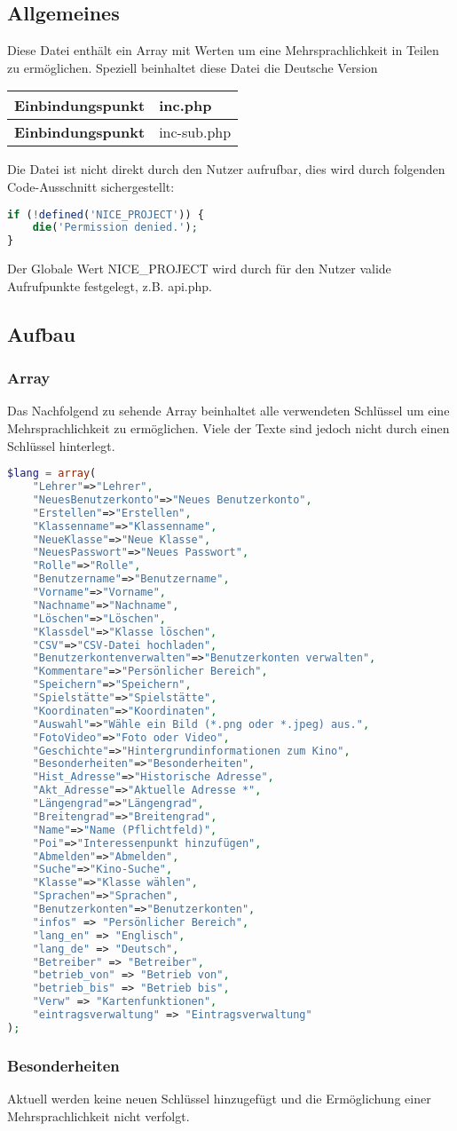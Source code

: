 \label{lang:de}
\subsection{Allgemeines} Diese Datei enthält ein Array mit Werten um eine Mehrsprachlichkeit in Teilen zu ermöglichen. Speziell beinhaltet diese Datei die Deutsche Version
\begin{table}[H]
	\begin{tabular}{|c|p{11cm}|}
		\hline
		\textbf{Einbindungspunkt} & inc.php \\ \hline
		\textbf{Einbindungspunkt} & inc-sub.php \\ \hline
	\end{tabular}
\end{table}
Die Datei ist nicht direkt durch den Nutzer aufrufbar, dies wird durch folgenden Code-Ausschnitt sichergestellt:
\begin{lstlisting}[language=php]
if (!defined('NICE_PROJECT')) {
	die('Permission denied.');
}
\end{lstlisting}
Der Globale Wert {\glqq NICE\_PROJECT\grqq} wird durch für den Nutzer valide Aufrufpunkte festgelegt, z.B. {\glqq api.php\grqq}.
\newpage
\subsection{Aufbau}
\subsubsection{Array}
Das Nachfolgend zu sehende Array beinhaltet alle verwendeten Schlüssel um eine Mehrsprachlichkeit zu ermöglichen. Viele der Texte sind jedoch nicht durch einen Schlüssel hinterlegt.
\begin{lstlisting}[language=php]
$lang = array(
	"Lehrer"=>"Lehrer",
	"NeuesBenutzerkonto"=>"Neues Benutzerkonto",
	"Erstellen"=>"Erstellen",
	"Klassenname"=>"Klassenname",
	"NeueKlasse"=>"Neue Klasse",
	"NeuesPasswort"=>"Neues Passwort",
	"Rolle"=>"Rolle",
	"Benutzername"=>"Benutzername",
	"Vorname"=>"Vorname",
	"Nachname"=>"Nachname",
	"Löschen"=>"Löschen",
	"Klassdel"=>"Klasse löschen",
	"CSV"=>"CSV-Datei hochladen",
	"Benutzerkontenverwalten"=>"Benutzerkonten verwalten",
	"Kommentare"=>"Persönlicher Bereich",
	"Speichern"=>"Speichern",
	"Spielstätte"=>"Spielstätte",
	"Koordinaten"=>"Koordinaten",
	"Auswahl"=>"Wähle ein Bild (*.png oder *.jpeg) aus.",
	"FotoVideo"=>"Foto oder Video",
	"Geschichte"=>"Hintergrundinformationen zum Kino",
	"Besonderheiten"=>"Besonderheiten",
	"Hist_Adresse"=>"Historische Adresse",
	"Akt_Adresse"=>"Aktuelle Adresse *",
	"Längengrad"=>"Längengrad",
	"Breitengrad"=>"Breitengrad",
	"Name"=>"Name (Pflichtfeld)",
	"Poi"=>"Interessenpunkt hinzufügen",
	"Abmelden"=>"Abmelden",
	"Suche"=>"Kino-Suche",
	"Klasse"=>"Klasse wählen",
	"Sprachen"=>"Sprachen",
	"Benutzerkonten"=>"Benutzerkonten",
	"infos" => "Persönlicher Bereich",
	"lang_en" => "Englisch",
	"lang_de" => "Deutsch",
	"Betreiber" => "Betreiber",
	"betrieb_von" => "Betrieb von",
	"betrieb_bis" => "Betrieb bis",
	"Verw" => "Kartenfunktionen",
	"eintragsverwaltung" => "Eintragsverwaltung"
);
\end{lstlisting}
\subsubsection{Besonderheiten}
Aktuell werden keine neuen Schlüssel hinzugefügt und die Ermöglichung einer Mehrsprachlichkeit nicht verfolgt.